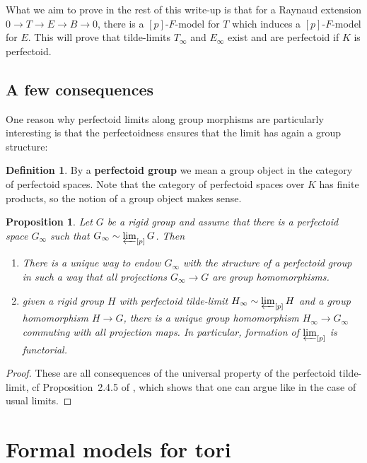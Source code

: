 \documentclass[11pt,oneside]{amsart}
\newtheorem{proposition}[theorem]{Proposition}
\theoremstyle{definition}
\newtheorem{definition}[theorem]{Definition}
\theoremstyle{remark}
\begin{document}
	What we aim to prove in the rest of this write-up is that for a Raynaud extension $0\rightarrow T\rightarrow E\rightarrow B\rightarrow 0$, there is a $[p]$-$F$-model for $T$ which induces a $[p]$-$F$-model for $E$. This will prove that tilde-limits $T_\infty$ and $E_\infty$ exist and are perfectoid if $K$ is perfectoid.
	
	\subsection{A few consequences}
	
	One reason why perfectoid limits along group morphisms are particularly interesting is that the perfectoidness ensures that the limit has again a group structure:
	
	\begin{definition}
		By a \textbf{perfectoid group} we mean a group object in the category of perfectoid spaces.
		Note that the category of perfectoid spaces over $K$ has finite products, so the notion of a group object makes sense. 
	\end{definition}
	
	\begin{proposition}\label{perfectoid tilde limit is perfectoid group in a functorial way}
		Let $G$ be a rigid group and assume that there is a perfectoid space $G_\infty$ such that $G_\infty \sim \varprojlim_{[p]} G$. Then
		\begin{enumerate}
		\item  There is a unique way to endow $G_\infty$ with the structure of a perfectoid group in such a way that all projections $G_\infty\rightarrow G$ are group homomorphisms.
		\item given a rigid group $H$ with perfectoid tilde-limit $H_\infty\sim\varprojlim_{[p]}H$ and a group homomorphism $H\rightarrow G$, there is a unique group homomorphism $H_\infty\rightarrow G_\infty$
		commuting with all projection maps. In particular, formation of $\varprojlim_{[p]}$ is functorial.
	\end{enumerate}
	\end{proposition}
	\begin{proof}
		These are all consequences of the universal property of the perfectoid tilde-limit, cf Proposition~2.4.5 of \cite{SW}, which shows that one can argue like in the case of usual limits.
	\end{proof}
	
	
	\section{Formal models for tori}
	
\end{document}
